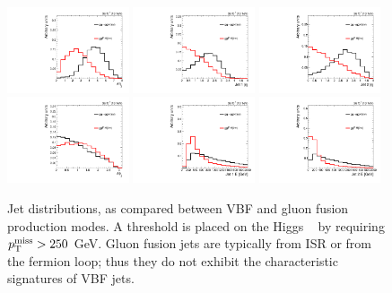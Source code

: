 \begin{figure}[]
    \begin{center}
        \includegraphics[width=0.32\textwidth]{figures/vbf/shapes_signal/loosesignal_jot12DEta.pdf}
        \includegraphics[width=0.32\textwidth]{figures/vbf/shapes_signal/loosesignal_fabsjotEta_0_.pdf}
        \includegraphics[width=0.32\textwidth]{figures/vbf/shapes_signal/loosesignal_fabsjotEta_1_.pdf} \\
        \includegraphics[width=0.32\textwidth]{figures/vbf/shapes_signal/loosesignal_jot12DPhi.pdf}
        \includegraphics[width=0.32\textwidth]{figures/vbf/shapes_signal/loosesignal_jotE_0_.pdf}
        \includegraphics[width=0.32\textwidth]{figures/vbf/shapes_signal/loosesignal_jotE_1_.pdf} 
        \caption{Jet distributions, as compared between VBF and gluon fusion production modes.
                 A threshold is placed on the Higgs \pt~  by requiring $p_\mathrm{T}^\mathrm{miss}>250$ GeV.
                 Gluon fusion jets are typically from ISR or from the fermion loop; thus they do not exhibit the characteristic signatures of VBF jets.}
        \label{fig:vbf:sigkins}
    \end{center}
\end{figure}

